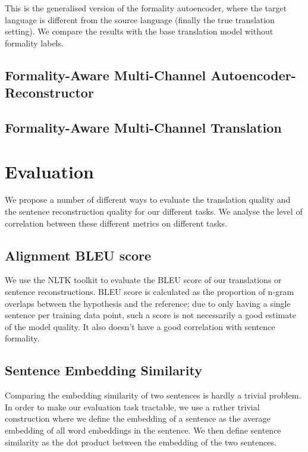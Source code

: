\documentclass[11pt]{article}
\begin{document}
This is the generalised version of the formality autoencoder, where the target language is different from the source language (finally the true translation setting). We compare the results with the base translation model without formality labels.

\subsection{Formality-Aware Multi-Channel Autoencoder-Reconstructor}

\subsection{Formality-Aware Multi-Channel Translation}

\section{Evaluation}

We propose a number of different ways to evaluate the translation quality and the sentence reconstruction quality for our different tasks. We analyse the level of correlation between these different metrics on different tasks.

\subsection{Alignment BLEU score}

We use the NLTK toolkit \cite{NLTK} to evaluate the BLEU score of our translations or sentence reconstructions. BLEU score is calculated as the proportion of n-gram overlaps between the hypothesis and the reference; due to only having a single sentence per training data point, such a score is not necessarily a good estimate of the model quality. It also doesn't have a good correlation with sentence formality.

\subsection{Sentence Embedding Similarity}

Comparing the embedding similarity of two sentences is hardly a trivial problem. In order to make our evaluation task tractable, we use a rather trivial construction where we define the embedding of a sentence as the average embedding of all word embeddings in the sentence. We then define sentence similarity as the dot product between the embedding of the two sentences. 
\end{document}
